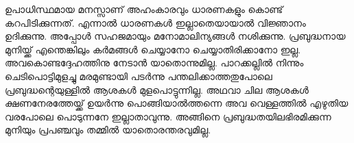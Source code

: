 ഉപാധിസ്ഥമായ മനസ്സാണ് അഹംകാരവും ധാരണകളും കൊണ്ട് കറപിടിക്കുന്നത്. എന്നാല്‍ ധാരണകള്‍ ഇല്ലാതെയായാല്‍ വിജ്ഞാനം ഉദിക്കുന്നു. അപ്പോള്‍ സഹജമായും മനോമാലിന്യങ്ങള്‍ നശിക്കുന്നു. പ്രബുദ്ധനായ മുനിയ്ക്ക്‌ എന്തെങ്കിലും കര്‍മങ്ങള്‍ ചെയ്യാനോ ചെയ്യാതിരിക്കാനോ ഇല്ല. അവകൊണ്ടദ്ദേഹത്തിനു നേടാന്‍ യാതൊന്നുമില്ല. പാറക്കല്ലില്‍ നിന്നും ചെടിപൊട്ടിമുളച്ചു മരമുണ്ടായി പടര്‍ന്നു പന്തലിക്കാത്തതുപോലെ  പ്രബുദ്ധന്റെയുള്ളില്‍ ആശകള്‍ മുളപൊട്ടുന്നില്ല. അഥവാ ചില ആശകള്‍ ക്ഷണനേരത്തേയ്ക്ക് ഉയര്‍ന്നു പൊങ്ങിയാല്‍ത്തന്നെ അവ വെള്ളത്തില്‍ എഴുതിയ വരപോലെ പൊടുന്നനേ ഇല്ലാതാവുന്നു. അങ്ങിനെ പ്രബുദ്ധതയിലഭിരമിക്കുന്ന മുനിയും പ്രപഞ്ചവും തമ്മില്‍ യാതൊരന്തരവുമില്ല.